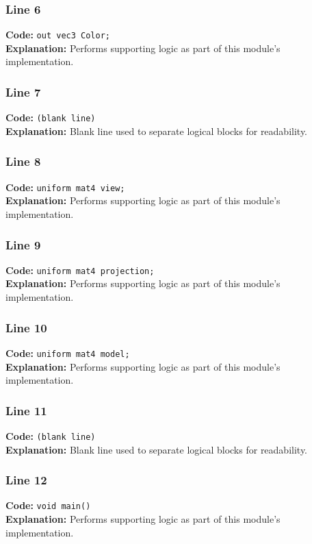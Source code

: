 \documentclass[11pt,a4paper]{article}
\begin{document}
\subsubsection*{Line 6}
\textbf{Code:} \verb|out vec3 Color;|\\
\textbf{Explanation:} Performs supporting logic as part of this module's implementation.

\subsubsection*{Line 7}
\textbf{Code:} \texttt{(blank line)}\\
\textbf{Explanation:} Blank line used to separate logical blocks for readability.

\subsubsection*{Line 8}
\textbf{Code:} \verb|uniform mat4 view;|\\
\textbf{Explanation:} Performs supporting logic as part of this module's implementation.

\subsubsection*{Line 9}
\textbf{Code:} \verb|uniform mat4 projection;|\\
\textbf{Explanation:} Performs supporting logic as part of this module's implementation.

\subsubsection*{Line 10}
\textbf{Code:} \verb|uniform mat4 model;|\\
\textbf{Explanation:} Performs supporting logic as part of this module's implementation.

\subsubsection*{Line 11}
\textbf{Code:} \texttt{(blank line)}\\
\textbf{Explanation:} Blank line used to separate logical blocks for readability.

\subsubsection*{Line 12}
\textbf{Code:} \verb|void main()|\\
\textbf{Explanation:} Performs supporting logic as part of this module's implementation.
\end{document}
